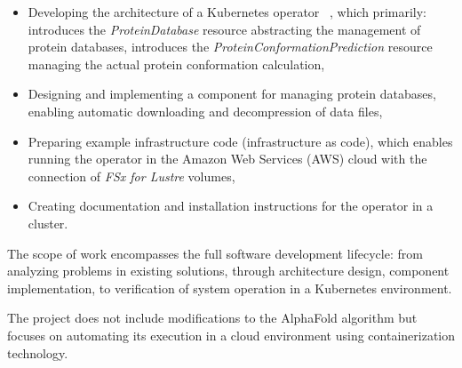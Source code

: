 \begin{itemize}
    \item Developing the architecture of a Kubernetes operator ~\cite{k8s_operators}, which primarily:
    \subitem introduces the \textit{ProteinDatabase} resource abstracting the management of protein databases,
    \subitem introduces the \textit{ProteinConformationPrediction} resource managing the actual protein conformation calculation,
    \item Designing and implementing a component for managing protein databases, enabling automatic downloading and decompression of data files,
    \item Preparing example infrastructure code (infrastructure as code), which enables running the operator in the Amazon Web Services (AWS) cloud with the connection of \textit{FSx for Lustre} volumes,
    \item Creating documentation and installation instructions for the operator in a cluster.
\end{itemize}

The scope of work encompasses the full software development lifecycle: from analyzing problems in existing solutions, through architecture design, component implementation, to verification of system operation in a Kubernetes environment.

The project does not include modifications to the AlphaFold algorithm but focuses on automating its execution in a cloud environment using containerization technology.
